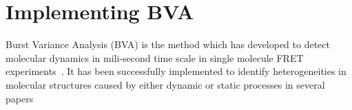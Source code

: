 \section{Implementing BVA}


Burst Variance Analysis (BVA) is the method which has developed to detect molecular dynamics in mili-second time scale in single molecule FRET experiments~\cite{Torella_2011}. It has been successfully implemented to identify heterogeneities in molecular structures caused by either dynamic or static processes in several papers